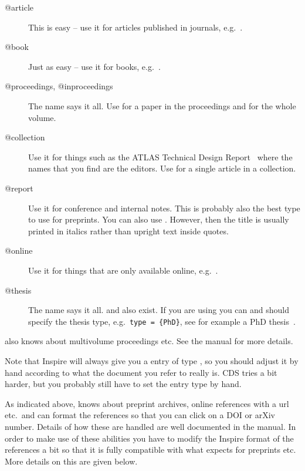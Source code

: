 \begin{description}
\item[@article] This is easy -- use it for articles published in
  journals, e.g.~\cite{Abramowicz:2010ih}.
\item[@book] Just as easy -- use it for books, e.g.~\cite{kopka04}.
\item[@proceedings, @inproceedings] The name says it all. Use
   for a paper in the proceedings and
   for the whole volume.
\item[@collection] Use it for things such as the ATLAS Technical Design
  Report~\cite{lhc:vol1} where the names that you find are the
  editors. Use  for a single article in a
  collection.
\item[@report] Use it for conference and
  internal notes. This is
  probably also the best type to use for preprints. You can also use
  . However, then the title is usually printed in
  italics rather than upright text inside quotes.
\item[@online] Use it for things that are only available online,
  e.g.~\cite{lshort}.
\item[@thesis] The name says it all.
    and
  also exist. If you are using  you can and should specify
  the thesis type, e.g.\ \texttt{type = \{PhD\}}, see for example a
  PhD thesis~\cite{tlodd:2012}.
\end{description}

 also knows about multivolume proceedings etc. See
the manual for more details.

Note that Inspire will always give you a \BibTeX{} entry of type
, so you should adjust it by hand according to what
the document you refer to really is. CDS tries a bit harder, but you
probably still have to set the entry type by hand.

As indicated above,  knows about preprint archives,
online references with a url etc.\ and can format the references so
that you can click on a DOI or arXiv number. Details of how these are
handled are well documented in the manual.  In order to make use of
these abilities you have to modify the Inspire format of the references
a bit so that it is fully compatible with what 
expects for preprints etc. More details on this are given below.

